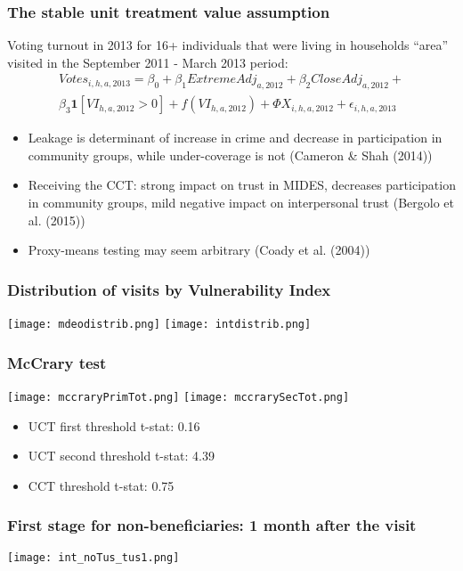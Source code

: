 \documentclass{beamer}
\begin{document}
\begin{frame}
\frametitle{The stable unit treatment value assumption}
Voting turnout in 2013 for 16+ individuals that were living in households ``area'' visited in the September 2011 - March 2013 period:
\begin{multline}
Votes_{i,h,a,2013} = \beta _0 + \beta_1ExtremeAdj_{a,2012} +\beta_2CloseAdj_{a,2012} + \\
\beta_3\mathbf{1}[VI_{h,a,2012}>0] + f(VI_{h,a,2012}) + \Phi X_{i,h,a,2012} + \epsilon_{i,h,a,2013}
\end{multline}
\begin{itemize}
\item Leakage is determinant of increase in crime and decrease in participation in community groups, while under-coverage is not (Cameron \& Shah (2014))
\item Receiving the CCT: strong impact on trust in MIDES, decreases participation in community groups, mild negative impact on interpersonal trust (Bergolo et al. (2015))
\item Proxy-means testing may seem arbitrary (Coady et al. (2004))
\end{itemize}
\end{frame}	

\begin{frame}
\frametitle{Distribution of visits by Vulnerability Index}
\begin{center}
\texttt{[image: mdeodistrib.png]}
\texttt{[image: intdistrib.png]}
\label{dist}
\end{center}
\end{frame}

\begin{frame}
\frametitle{McCrary test}
\begin{center}
	\texttt{[image: mccraryPrimTot.png]} 
	\texttt{[image: mccrarySecTot.png]}
	\label{mccrary}
\end{center}
\begin{itemize}
	\item UCT first threshold t-stat: 0.16
	\item UCT second threshold t-stat: 4.39
	\item CCT threshold t-stat: 0.75
\end{itemize}
\end{frame}

\begin{frame}
\frametitle{First stage for non-beneficiaries: 1 month after the visit}
\begin{center}
\texttt{[image: int\_noTus\_tus1.png]}
\label{int_noTus_tus1}
\end{center}
\end{frame}
\end{document}
